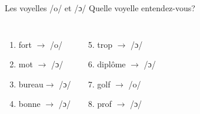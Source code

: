 \begin{frame}{Les voyelles /o/ et /ɔ/}
  Quelle voyelle entendez-vous? \\
  \begin{columns}
      \begin{enumerate}
        \item fort $\to$ /o/ 
        \item mot $\to$  /ɔ/
        \item bureau$\to$  /ɔ/
        \item bonne $\to$  /ɔ/
      \end{enumerate}
      \begin{enumerate}
        \setcounter{enumi}{4}
        \item trop $\to$  /ɔ/
        \item diplôme $\to$  /ɔ/
        \item golf $\to$ /o/ 
        \item prof $\to$  /ɔ/
      \end{enumerate}
  \end{columns}
\end{frame}